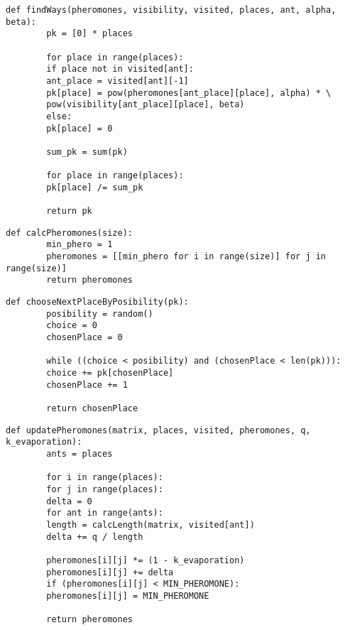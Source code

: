 \clearpage


\begin{center}
	\captionsetup{justification=raggedright,singlelinecheck=off}
	\begin{lstlisting}[label=lst:prob_arr,caption=Реализация алгоритма нахождения массива вероятностей переходов в непосещенные города]
	def findWays(pheromones, visibility, visited, places, ant, alpha, beta):
		pk = [0] * places
		
		for place in range(places):
		if place not in visited[ant]:
		ant_place = visited[ant][-1]
		pk[place] = pow(pheromones[ant_place][place], alpha) * \
		pow(visibility[ant_place][place], beta)
		else:
		pk[place] = 0
		
		sum_pk = sum(pk)
		
		for place in range(places):
		pk[place] /= sum_pk
		
		return pk
	\end{lstlisting}
\end{center}

\begin{center}
	\captionsetup{justification=raggedright,singlelinecheck=off}
	\begin{lstlisting}[label=lst:pheromone_above_Zero,caption=Реализация алгоритма нахождения массива вероятностей переходов в непосещенные города]
		def calcPheromones(size):
		min_phero = 1
		pheromones = [[min_phero for i in range(size)] for j in range(size)]
		return pheromones
	\end{lstlisting}
\end{center}


\clearpage

\begin{center}
	\captionsetup{justification=raggedright,singlelinecheck=off}
	\begin{lstlisting}[label=lst:choose_next,caption=Реализация алгоритма выбора следующего города]
	def chooseNextPlaceByPosibility(pk):
		posibility = random()
		choice = 0
		chosenPlace = 0
		
		while ((choice < posibility) and (chosenPlace < len(pk))):
		choice += pk[chosenPlace]
		chosenPlace += 1
		
		return chosenPlace
	\end{lstlisting}
\end{center}


\begin{center}
	\captionsetup{justification=raggedright,singlelinecheck=off}
	\begin{lstlisting}[label=lst:upd_pher,caption=Реализация алгоритма обновления матрицы феромонов]
	def updatePheromones(matrix, places, visited, pheromones, q, k_evaporation):
		ants = places
		
		for i in range(places):
		for j in range(places):
		delta = 0
		for ant in range(ants):
		length = calcLength(matrix, visited[ant])
		delta += q / length
		
		pheromones[i][j] *= (1 - k_evaporation)
		pheromones[i][j] += delta
		if (pheromones[i][j] < MIN_PHEROMONE):
		pheromones[i][j] = MIN_PHEROMONE
		
		return pheromones
	\end{lstlisting}
\end{center}

